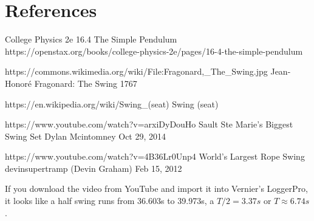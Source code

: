 \documentclass[12pt]{iopart}
\begin{document}
\section*{References}
\begin{thebibliography}{99}

College Physics 2e
16.4 The Simple Pendulum
https://openstax.org/books/college-physics-2e/pages/16-4-the-simple-pendulum

	https://commons.wikimedia.org/wiki/File:Fragonard,\_The\_Swing.jpg
	Jean-Honoré Fragonard: The Swing 
	1767

	https://en.wikipedia.org/wiki/Swing\_(seat)
		Swing (seat)

https://www.youtube.com/watch?v=arxiDyDouHo
Sault Ste Marie's Biggest Swing Set
Dylan Mcintomney
Oct 29, 2014

https://www.youtube.com/watch?v=4B36Lr0Unp4
World's Largest Rope Swing
devinsupertramp (Devin Graham)
Feb 15, 2012

 If you download the video from YouTube and import it into Vernier's LoggerPro, it looks like a half swing runs from 36.603s to 39.973s, a $T/2=3.37s$ or $T\approx6.74s$.  
\end{thebibliography}
\end{document}
